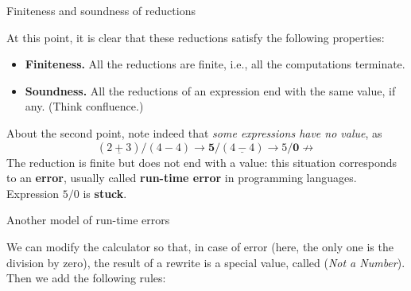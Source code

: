 %
\begin{frame}{Finiteness and soundness of reductions}

  At this point, it is clear that these reductions satisfy the
  following properties:
  \begin{itemize}

    \item \textbf{Finiteness.} All the reductions are finite, i.e.,
      all the computations terminate.

    \item \textbf{Soundness.} All the reductions of an expression end
      with the same value, if any. (Think confluence.)

  \end{itemize}

  About the second point, note indeed that \emph{some expressions have
  no value}, as
  \begin{equation*}
    (\underline{2+3})/(4-4) \rightarrow \textbf{5}/(\underline{4-4})
    \rightarrow 5/\textbf{0} \nrightarrow
  \end{equation*}
  The reduction is finite but does not end with a value: this
  situation corresponds to an \textbf{error}, usually called
  \textbf{run\hyp{}time error} in programming languages. Expression
  \(5/0\) is \textbf{stuck}.

\end{frame}

%
\begin{frame}{Another model of run-time errors}

  We can modify the calculator so that, in case of error (here, the
  only one is the division by zero), the result of a rewrite is a
  special value, called \NaN (\emph{Not a Number}). Then we add the
  following rules:

\end{frame}

